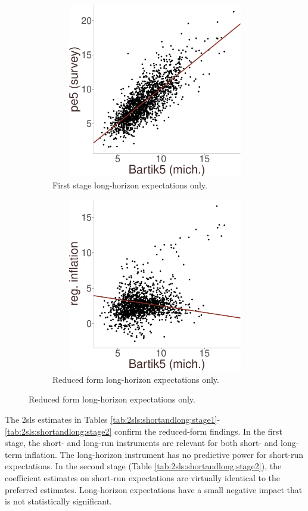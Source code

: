 \documentclass[12pt]{article}
\begin{document}
\begin{figure}
\centering
\caption{Long-run inflation expectations: reduced-form estimates.}\label{fig:5year:redform}
\begin{subfigure}[t]{0.75\textwidth}
\centering
\includegraphics[width = 5in, height =3in]{figs/firstStage5only}
\caption{First stage long-horizon expectations only. }\label{5yearsubfig:shares:group}
\end{subfigure}
\vfill
\begin{subfigure}[t]{0.75\textwidth}
\centering
\includegraphics[width =5in, height =3in]{figs/redform5only}
\caption{Reduced form long-horizon expectations only.}\label{5yearsubfig:shares:cps}
\end{subfigure}
\end{figure}

The 2sls estimates in Tables \ref{tab:2sls:shortandlong:stage1}-\ref{tab:2sls:shortandlong:stage2} confirm the reduced-form findings. In the first stage, the short- and long-run instruments are relevant for both short- and long-term inflation. The long-horizon instrument has no predictive power for short-run expectations. In the second stage (Table \ref{tab:2sls:shortandlong:stage2}), the coefficient estimates on short-run expectations are virtually identical to the preferred estimates. Long-horizon expectations have a small negative impact that is not statistically significant.  
\end{document}
